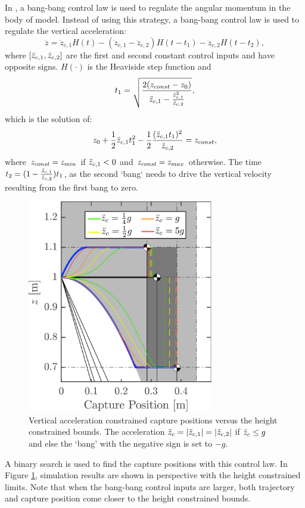 In \cite{pratt2006capture,stephens2007humanoid,koolen2012capturability}, a bang-bang control law is used to regulate the angular momentum in the body of model. Instead of using this strategy, a bang-bang control law is used to regulate the vertical acceleration:
\begin{equation}
	\ddot{z} = \ddot{z}_{c,1}H(t) - (\ddot{z}_{c,1} - \ddot{z}_{c,2})H(t-t_1) - \ddot{z}_{c,2}H(t-t_2),
\end{equation}
where $[\ddot{z}_{c,1},\ddot{z}_{c,2}]$ are the first and second constant control inputs and have opposite signs. $H(\cdot)$ is the Heaviside step function and 
\begin{equation}
t_1=\sqrt{\frac{2(z_{const}-z_0)}{\ddot{z}_{c,1} - \frac{\ddot{z}_{c,1}^2}{\ddot{z}_{c,2}}}},
\end{equation}
which is the solution of:
\begin{equation}
	z_0+\frac{1}{2}\ddot{z}_{c,1} t_1^2 - \frac{1}{2}\frac{(\ddot{z}_{c,1} t_1)^2}{\ddot{z}_{c,2}}= z_{const},
\end{equation}
where $z_{const}=z_{min}$ if $\ddot{z}_{c,1} <0$ and $z_{const}=z_{max}$ otherwise. The time $t_2=(1-\frac{\ddot{z}_{c,1}}{\ddot{z}_{c,2}})t_1$, as the second `bang` needs to drive the vertical velocity resulting from the first bang to zero. 
\begin{figure}
      \centering
      \includegraphics[width=3.2in]{STYLESTUFF/CPLimitsForce.png}
      \caption{Vertical acceleration constrained capture positions versus the height constrained bounds. The acceleration $\ddot{z}_{c}=|\ddot{z}_{c,1}|=|\ddot{z}_{c,2}|$ if $\ddot{z}_{c} \leq g$ and else the `bang' with the negative sign is set to $-g$.}
      \label{fig:zvsf}
\end{figure}

A binary search is used to find the capture positions with this control law. In Figure \ref{fig:zvsf}, simulation results are shown in perspective with the height constrained limits. Note that when the bang-bang control inputs are larger, both trajectory and capture position come closer to the height constrained bounds.

